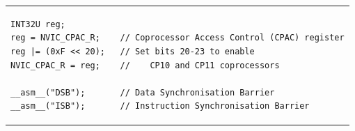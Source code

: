 \begin{tabular}{l}
\begin{lstlisting}[title=init\_FPU()]
INT32U reg;
reg = NVIC_CPAC_R;    // Coprocessor Access Control (CPAC) register
reg |= (0xF << 20);   // Set bits 20-23 to enable 
NVIC_CPAC_R = reg;    // 	CP10 and CP11 coprocessors

__asm__("DSB");       // Data Synchronisation Barrier
__asm__("ISB");       // Instruction Synchronisation Barrier
\end{lstlisting}
\end{tabular}


 